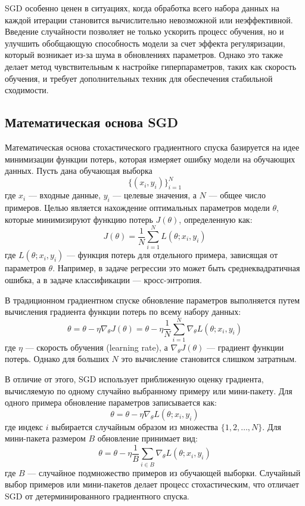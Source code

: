 \documentclass[11pt,a4paper]{article}
\begin{document}
SGD особенно ценен в ситуациях, когда обработка всего набора данных на каждой итерации становится вычислительно невозможной или неэффективной. Введение случайности позволяет не только ускорить процесс обучения, но и улучшить обобщающую способность модели за счет эффекта регуляризации, который возникает из-за шума в обновлениях параметров. Однако это также делает метод чувствительным к настройке гиперпараметров, таких как скорость обучения, и требует дополнительных техник для обеспечения стабильной сходимости.

\subsection{Математическая основа SGD}
Математическая основа стохастического градиентного спуска базируется на идее минимизации функции потерь, которая измеряет ошибку модели на обучающих данных. Пусть дана обучающая выборка 
\begin{equation}
\{(x_i, y_i)\}_{i=1}^N
\end{equation}
где \( x_i \) — входные данные, \( y_i \) — целевые значения, а \( N \) — общее число примеров. Целью является нахождение оптимальных параметров модели \( \theta \), которые минимизируют функцию потерь \( J(\theta) \), определенную как:
\begin{equation}
J(\theta) = \frac{1}{N} \sum_{i=1}^N L(\theta; x_i, y_i)
\end{equation}
где \( L(\theta; x_i, y_i) \) — функция потерь для отдельного примера, зависящая от параметров \( \theta \). Например, в задаче регрессии это может быть среднеквадратичная ошибка, а в задаче классификации — кросс-энтропия.

В традиционном градиентном спуске обновление параметров выполняется путем вычисления градиента функции потерь по всему набору данных:
\begin{equation}
\theta = \theta - \eta \nabla_\theta J(\theta) = \theta - \eta \frac{1}{N} \sum_{i=1}^N \nabla_\theta L(\theta; x_i, y_i)
\end{equation}
где \( \eta \) — скорость обучения (learning rate), а \( \nabla_\theta J(\theta) \) — градиент функции потерь. Однако для больших \( N \) это вычисление становится слишком затратным.

В отличие от этого, SGD использует приближенную оценку градиента, вычисляемую по одному случайно выбранному примеру или мини-пакету. Для одного примера обновление параметров записывается как:
\begin{equation}
\theta = \theta - \eta \nabla_\theta L(\theta; x_i, y_i)
\end{equation}
где индекс \( i \) выбирается случайным образом из множества \( \{1, 2, \dots, N\} \). Для мини-пакета размером \( B \) обновление принимает вид:
\begin{equation}
\theta = \theta - \eta \frac{1}{B} \sum_{i \in B} \nabla_\theta L(\theta; x_i, y_i)
\end{equation}
где \( B \) — случайное подмножество примеров из обучающей выборки. Случайный выбор примеров или мини-пакетов делает процесс стохастическим, что отличает SGD от детерминированного градиентного спуска.
\end{document}
